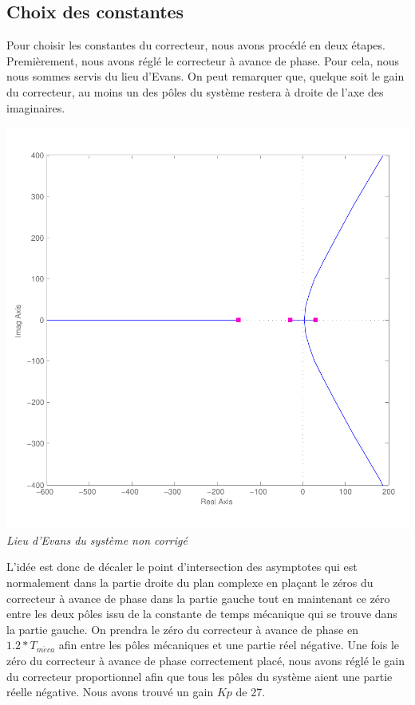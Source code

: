 \documentclass[11pt, french]{article} %
\begin{document}
\subsection{Choix des constantes}

Pour choisir les constantes du correcteur, nous avons procédé en deux étapes. Premièrement, nous avons réglé le correcteur à avance de phase. Pour cela, nous nous sommes servis du lieu d'Evans. On peut remarquer que, quelque soit le gain du correcteur, au moins un des pôles du système restera à droite de l'axe des imaginaires.

\begin{center}
\includegraphics [scale=0.50]{RL_Sys_Seul.pdf}\\
\vspace{-10pt}
\emph{Lieu d'Evans du système non corrigé}
\end{center}

L'idée est donc de décaler le point d'intersection des asymptotes qui est normalement dans la partie droite du plan complexe en plaçant le zéros du correcteur à avance de phase dans la partie gauche tout en maintenant ce zéro entre les deux pôles issu de la constante de temps mécanique qui se trouve dans la partie gauche. On prendra le zéro du correcteur à avance de phase en $1.2*T_{m\acute{e}ca}$ afin entre les pôles mécaniques et une partie réel négative. Une fois le zéro du correcteur à avance de phase correctement placé, nous avons réglé le gain du correcteur proportionnel afin que tous les pôles du système aient une partie réelle négative. Nous avons trouvé un gain $Kp$ de 27. 
\end{document}

